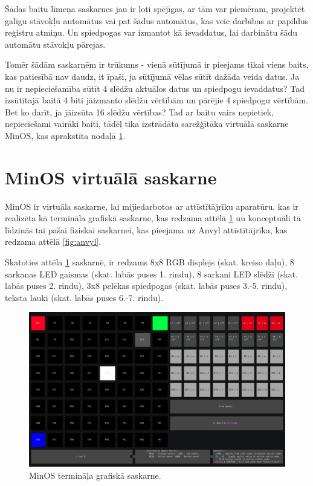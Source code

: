 Šādas baitu līmeņa saskarnes jau ir ļoti spējīgas, ar tām var piemēram,
projektēt galīgu stāvokļu automātus vai pat šādus automātus, kas veic darbības
ar papildus reģistru atmiņu. Un spiedpogas var izmantot kā ievaddatus, lai
darbinātu šādu automātu stāvokļu pārejas.

Tomēr šādām saskarnēm ir trūkums - vienā sūtījumā ir pieejams tikai viens baits,
kas patiesībā nav daudz, it īpaši, ja sūtījumā vēlas sūtīt dažāda veida datus.
Ja nu ir nepieciešamība sūtīt 4 slēdžu aktuālos datus un spiedpogu ievaddatus?
Tad izsūtītajā baitā 4 biti jāizmanto slēdžu vērtībām un pārējie 4 spiedpogu
vērtībām. Bet ko darīt, ja jāizsūta 16 slēdžu vērtības? Tad ar baitu vairs
nepietiek, nepieciešami vairāki baiti, tādēļ tika izstrādāta sarežģītāka
virtuālā saskarne MinOS, kas aprakstīta nodaļā \ref{sec:vinminos}.

\section{MinOS virtuālā saskarne}
\label{sec:vinminos}

MinOS ir virtuāla saskarne, lai mijiedarbotos ar attīstītājrīku aparatūru, kas
ir realizēta kā termināļa grafiskā saskarne, kas redzama attēlā
\ref{fig:minosgui} un konceptuāli tā līdzinās tai pašai fiziskai saskarnei, kas
pieejama uz Anvyl attīstītājrīka, kas redzama attēlā \ref{fig:anvyl}. 

Skatoties attēla \ref{fig:minosgui} saskarnē, ir redzams 8x8 RGB displejs (skat.
kreiso daļu), 8 sarkanas LED gaismas (skat. labās puses 1. rindu), 8 sarkani LED
slēdži (skat. labās puses 2. rindu), 3x8 pelēkas spiedpogas (skat. labās puses
3.-5. rindu), teksta lauki (skat. labās puses 6.-7. rindu). 

\begin{figure}[H]
    \includegraphics[width=1.0\linewidth]{assets/min-os-execution.png}
    \centering
    \caption{MinOS termināļa grafiskā saskarne.}
    \label{fig:minosgui}
\end{figure}

